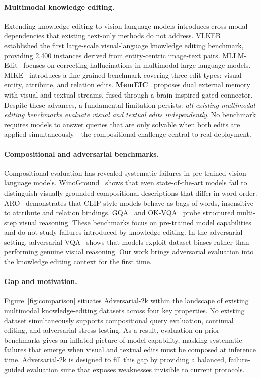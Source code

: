 \documentclass{article}
\newcommand{\memeic}{\textbf{MemEIC}}
\begin{document}
\paragraph{Multimodal knowledge editing.}
Extending knowledge editing to vision-language models introduces cross-modal dependencies that existing text-only methods do not address. VLKEB~\cite{vlkeb24} established the first large-scale visual-language knowledge editing benchmark, providing 2{,}400 instances derived from entity-centric image-text pairs. MLLM-Edit~\cite{mllmedit23} focuses on correcting hallucinations in multimodal large language models. MIKE~\cite{mike24} introduces a fine-grained benchmark covering three edit types: visual entity, attribute, and relation edits. \memeic{}~\cite{memeic2025} proposes dual external memory with visual and textual streams, fused through a brain-inspired gated connector. Despite these advances, a fundamental limitation persists: \emph{all existing multimodal editing benchmarks evaluate visual and textual edits independently}. No benchmark requires models to answer queries that are only solvable when both edits are applied simultaneously---the compositional challenge central to real deployment.

\paragraph{Compositional and adversarial benchmarks.}
Compositional evaluation has revealed systematic failures in pre-trained vision-language models. WinoGround~\cite{winoground22} shows that even state-of-the-art models fail to distinguish visually grounded compositional descriptions that differ in word order. ARO~\cite{aro23} demonstrates that CLIP-style models behave as bags-of-words, insensitive to attribute and relation bindings. GQA~\cite{gqa19} and OK-VQA~\cite{okvqa19} probe structured multi-step visual reasoning. These benchmarks focus on pre-trained model capabilities and do not study failures introduced by knowledge editing. In the adversarial setting, adversarial VQA~\cite{li2019vqa} shows that models exploit dataset biases rather than performing genuine visual reasoning. Our work brings adversarial evaluation into the knowledge editing context for the first time.

\paragraph{Gap and motivation.}
Figure~\ref{fig:comparison} situates Adversarial-2k within the landscape of existing multimodal knowledge-editing datasets across four key properties. No existing dataset simultaneously supports compositional query evaluation, continual editing, and adversarial stress-testing. As a result, evaluation on prior benchmarks gives an inflated picture of model capability, masking systematic failures that emerge when visual and textual edits must be composed at inference time. Adversarial-2k is designed to fill this gap by providing a balanced, failure-guided evaluation suite that exposes weaknesses invisible to current protocols.
\end{document}
